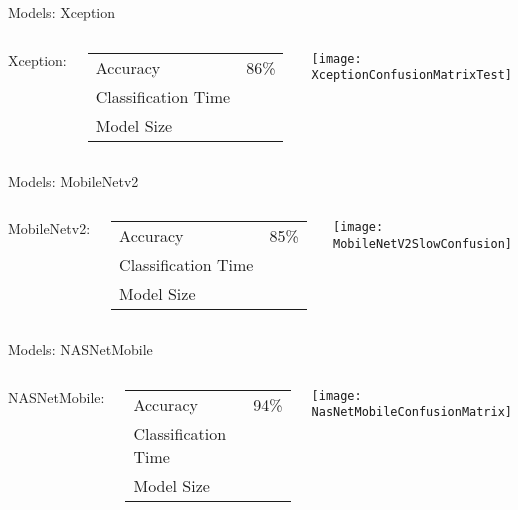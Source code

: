 \documentclass{beamer}
\begin{document}
\begin{frame}{Models: Xception}
	\begin{columns}
		Xception:
		\begin{tabular}{l l}
			Accuracy & 86\% \\
			Classification Time &  \\
			Model Size &  \\
		\end{tabular}
		\texttt{[image: XceptionConfusionMatrixTest]}
	\end{columns}
\end{frame}

\begin{frame}{Models: MobileNetv2}
	\begin{columns}
		\column{0.4\textwidth}
		MobileNetv2:
		\begin{tabular}{l l}
			Accuracy & 85\% \\
			Classification Time &  \\
			Model Size &  \\
		\end{tabular}
		\column{0.6\textwidth}
		\texttt{[image: MobileNetV2SlowConfusion]}
	\end{columns}
\end{frame}

\begin{frame}{Models: NASNetMobile}
	\begin{columns}
		NASNetMobile:
		\begin{tabular}{l l}
			Accuracy & 94\% \\
			Classification Time &  \\
			Model Size &  \\
		\end{tabular}
		\texttt{[image: NasNetMobileConfusionMatrix]}
	\end{columns}
\end{frame}
\end{document}
